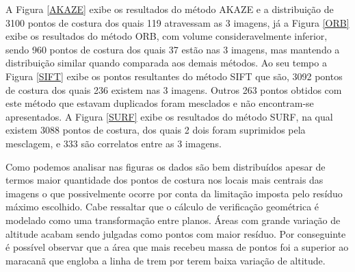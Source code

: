 A Figura \ref{AKAZE} exibe os resultados do método AKAZE e a distribuição de 3100 pontos de costura dos quais 119 atravessam as 3 imagens, já a Figura \ref{ORB} exibe os resultados do método ORB, com volume consideravelmente inferior, sendo  960 pontos de costura dos quais 37 estão nas 3 imagens, mas mantendo a distribuição similar quando comparada aos demais métodos. Ao seu tempo a Figura \ref{SIFT} exibe os pontos resultantes do método SIFT que são, 3092 pontos de costura dos quais 236 existem nas 3 imagens. Outros 263 pontos obtidos com este método que estavam duplicados foram mesclados e não encontram-se apresentados. A Figura \ref{SURF} exibe os resultados do método SURF, na qual existem 3088 pontos de costura, dos quais 2 dois foram suprimidos pela mesclagem, e 333 são correlatos entre as 3 imagens.

Como podemos analisar nas figuras os dados são bem distribuídos apesar de termos maior quantidade dos pontos de costura nos locais mais centrais das imagens o que possivelmente ocorre por conta da limitação imposta pelo resíduo máximo escolhido. Cabe ressaltar que o cálculo de verificação geométrica é modelado como uma transformação entre planos. Áreas com grande variação de altitude acabam sendo julgadas como pontos com maior resíduo. Por conseguinte é possível observar que a área que mais recebeu massa de pontos foi a superior ao maracanã que engloba a linha de trem por terem baixa variação de altitude.

